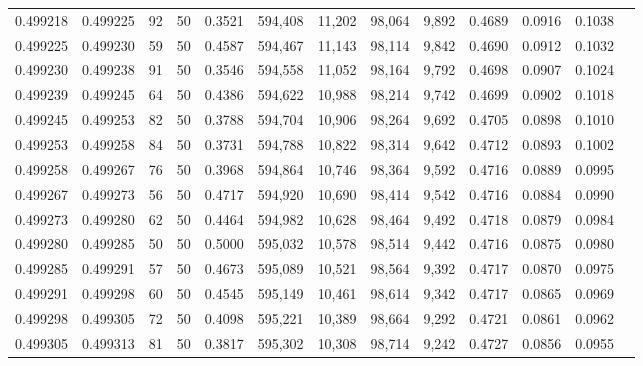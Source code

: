\begin{tabular}{rrrrrrrrrrrrr}
0.499218 & 0.499225 &    92 &  50 &                                     0.3521 & 594,408 &  11,202 &  98,064 &   9,892 & 0.4689 & 0.0916 & 0.1038 \\
0.499225 & 0.499230 &    59 &  50 &                                     0.4587 & 594,467 &  11,143 &  98,114 &   9,842 & 0.4690 & 0.0912 & 0.1032 \\
0.499230 & 0.499238 &    91 &  50 &                                     0.3546 & 594,558 &  11,052 &  98,164 &   9,792 & 0.4698 & 0.0907 & 0.1024 \\
0.499239 & 0.499245 &    64 &  50 &                                     0.4386 & 594,622 &  10,988 &  98,214 &   9,742 & 0.4699 & 0.0902 & 0.1018 \\
0.499245 & 0.499253 &    82 &  50 &                                     0.3788 & 594,704 &  10,906 &  98,264 &   9,692 & 0.4705 & 0.0898 & 0.1010 \\
0.499253 & 0.499258 &    84 &  50 &                                     0.3731 & 594,788 &  10,822 &  98,314 &   9,642 & 0.4712 & 0.0893 & 0.1002 \\
0.499258 & 0.499267 &    76 &  50 &                                     0.3968 & 594,864 &  10,746 &  98,364 &   9,592 & 0.4716 & 0.0889 & 0.0995 \\
0.499267 & 0.499273 &    56 &  50 &                                     0.4717 & 594,920 &  10,690 &  98,414 &   9,542 & 0.4716 & 0.0884 & 0.0990 \\
0.499273 & 0.499280 &    62 &  50 &                                     0.4464 & 594,982 &  10,628 &  98,464 &   9,492 & 0.4718 & 0.0879 & 0.0984 \\
0.499280 & 0.499285 &    50 &  50 &                                     0.5000 & 595,032 &  10,578 &  98,514 &   9,442 & 0.4716 & 0.0875 & 0.0980 \\
0.499285 & 0.499291 &    57 &  50 &                                     0.4673 & 595,089 &  10,521 &  98,564 &   9,392 & 0.4717 & 0.0870 & 0.0975 \\
0.499291 & 0.499298 &    60 &  50 &                                     0.4545 & 595,149 &  10,461 &  98,614 &   9,342 & 0.4717 & 0.0865 & 0.0969 \\
0.499298 & 0.499305 &    72 &  50 &                                     0.4098 & 595,221 &  10,389 &  98,664 &   9,292 & 0.4721 & 0.0861 & 0.0962 \\
0.499305 & 0.499313 &    81 &  50 &                                     0.3817 & 595,302 &  10,308 &  98,714 &   9,242 & 0.4727 & 0.0856 & 0.0955 \\

\end{tabular}
